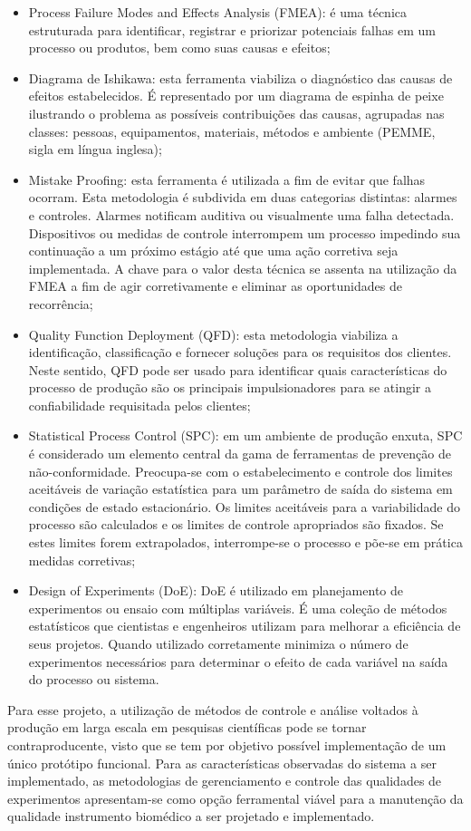 \begin{anexosenv}
\begin{itemize}
\item Process Failure Modes and Effects Analysis (FMEA): é uma técnica estruturada para identificar, registrar e priorizar potenciais falhas em um processo ou produtos, bem como suas causas e efeitos;
\item Diagrama de Ishikawa: esta ferramenta viabiliza o diagnóstico das causas de efeitos estabelecidos. É representado por um diagrama de espinha de peixe ilustrando o problema as possíveis contribuições das causas, agrupadas nas classes: pessoas, equipamentos, materiais, métodos e ambiente (PEMME, sigla em língua inglesa);
\item Mistake Proofing: esta ferramenta é utilizada a fim de evitar que falhas ocorram. Esta metodologia é subdivida em duas categorias distintas: alarmes e controles. Alarmes notificam auditiva ou visualmente uma falha detectada. Dispositivos ou medidas de controle interrompem um processo impedindo sua continuação a um próximo estágio até que uma ação corretiva seja implementada. A chave para o valor desta técnica se assenta na utilização da FMEA a fim de agir corretivamente e eliminar as oportunidades de recorrência;
\item Quality Function Deployment (QFD): esta metodologia viabiliza a identificação, classificação e fornecer soluções para os requisitos dos clientes. Neste sentido, QFD pode ser usado para identificar quais características do processo de produção são os principais impulsionadores para se atingir a confiabilidade requisitada pelos clientes;
\item Statistical Process Control (SPC): em um ambiente de produção enxuta, SPC é considerado um elemento central da gama de ferramentas de prevenção de não-conformidade. Preocupa-se com o estabelecimento e controle dos limites aceitáveis de variação estatística para um parâmetro de saída do sistema em condições de estado estacionário. Os limites aceitáveis para a variabilidade do processo são calculados e os limites de controle apropriados são fixados. Se estes limites forem extrapolados, interrompe-se o processo e põe-se em prática medidas corretivas;
\item Design of Experiments (DoE): DoE é utilizado em planejamento de experimentos ou ensaio com múltiplas variáveis. É uma coleção de métodos estatísticos que cientistas e engenheiros utilizam para melhorar a eficiência de seus projetos. Quando utilizado corretamente minimiza o número de experimentos necessários para determinar o efeito de cada variável na saída do processo ou sistema. 
\end{itemize}

Para esse projeto, a utilização de métodos de controle e análise voltados à produção em larga escala em pesquisas científicas pode se tornar contraproducente, visto que se tem por objetivo possível implementação de um único protótipo funcional. Para as características observadas do sistema a ser implementado, as metodologias de gerenciamento e controle das qualidades de experimentos apresentam-se como opção ferramental viável para a manutenção da qualidade instrumento biomédico a ser projetado e implementado.

\end{anexosenv}
